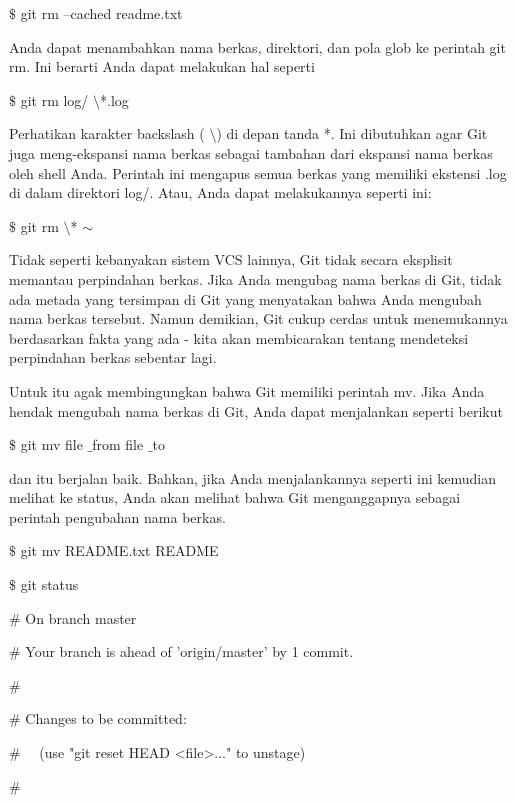 \vspace{12pt}
\noindent 
 $  \$  $ git rm --cached readme.txt \par
\noindent 
Anda dapat menambahkan nama berkas, direktori, dan pola glob ke perintah git rm. Ini berarti Anda dapat melakukan hal seperti \par
\vspace{12pt}
\noindent 
 $  \$  $ git rm log/ $  \setminus  $*.log \par
\noindent 
Perhatikan karakter backslash ( $  \setminus  $) di depan tanda *. Ini dibutuhkan agar Git juga meng-ekspansi nama berkas sebagai tambahan dari ekspansi nama berkas oleh shell Anda. Perintah ini mengapus semua berkas yang memiliki ekstensi .log di dalam direktori log/. Atau, Anda dapat melakukannya seperti ini: \par
\noindent 
 $  \$  $ git rm  $  \setminus  $* $  \sim  $ \par
\noindent 
Tidak seperti kebanyakan sistem VCS lainnya, Git tidak secara eksplisit memantau perpindahan berkas. Jika Anda mengubag nama berkas di Git, tidak ada metada yang tersimpan di Git yang menyatakan bahwa Anda mengubah nama berkas tersebut. Namun demikian, Git cukup cerdas untuk menemukannya berdasarkan fakta yang ada - kita akan membicarakan tentang mendeteksi perpindahan berkas sebentar lagi. \par
\noindent 
Untuk itu agak membingungkan bahwa Git memiliki perintah mv. Jika Anda hendak mengubah nama berkas di Git, Anda dapat menjalankan seperti berikut \par
\noindent 
 $  \$  $ git mv file $  \_  $from file $  \_  $to \par
\noindent 
dan itu berjalan baik. Bahkan, jika Anda menjalankannya seperti ini kemudian melihat ke status, Anda akan melihat bahwa Git menganggapnya sebagai perintah pengubahan nama berkas.  \par
\noindent 
 $  \$  $ git mv README.txt README \par
\noindent 
 $  \$  $ git status \par
\noindent 
 $  \#  $ On branch master \par
\noindent 
 $  \#  $ Your branch is ahead of 'origin/master' by 1 commit. \par
\noindent 
 $  \#  $ \par
\noindent 
 $  \#  $ Changes to be committed: \par
\noindent 
 $  \#  $~~ (use "git reset HEAD <file>..." to unstage) \par
\noindent 
 $  \#  $ \par
